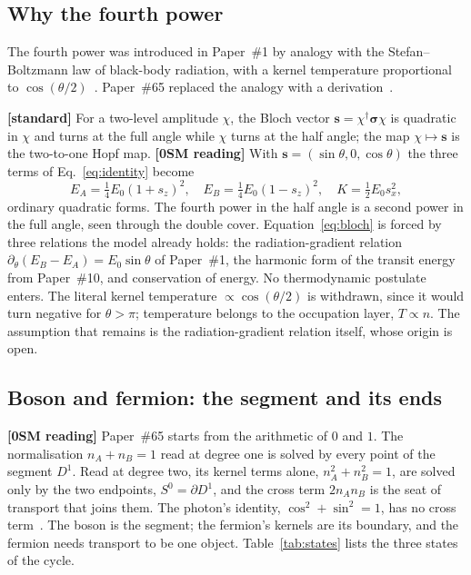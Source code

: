 \documentclass[%
 reprint, amsmath,amssymb, aps, prb, ]{revtex4-2}
\numberwithin{equation}{section}
\begin{document}
\subsection{Why the fourth power}

The fourth power was introduced in Paper~\#1 by analogy with the Stefan--Boltzmann law of black-body radiation, with a kernel temperature proportional to $\cos(\theta/2)$~\cite{hanamura01}. Paper~\#65 replaced the analogy with a derivation~\cite{hanamura65}.

\textbf{[standard]} For a two-level amplitude $\chi$, the Bloch vector $\mathbf s = \chi^{\dagger}\bm\sigma\chi$ is quadratic in $\chi$ and turns at the full angle while $\chi$ turns at the half angle; the map $\chi\mapsto\mathbf s$ is the two-to-one Hopf map. \textbf{[0SM reading]} With $\mathbf s = (\sin\theta, 0, \cos\theta)$ the three terms of Eq.~\eqref{eq:identity} become
\begin{equation}
E_A = \tfrac14E_0(1+s_z)^{2}, \quad E_B = \tfrac14E_0(1-s_z)^{2}, \quad K = \tfrac12E_0 s_x^{2},
\label{eq:bloch}
\end{equation}
ordinary quadratic forms. The fourth power in the half angle is a second power in the full angle, seen through the double cover. Equation~\eqref{eq:bloch} is forced by three relations the model already holds: the radiation-gradient relation $\partial_\theta(E_B-E_A) = E_0\sin\theta$ of Paper~\#1, the harmonic form of the transit energy from Paper~\#10, and conservation of energy. No thermodynamic postulate enters. The literal kernel temperature $\propto\cos(\theta/2)$ is withdrawn, since it would turn negative for $\theta>\pi$; temperature belongs to the occupation layer, $T\propto n$. The assumption that remains is the radiation-gradient relation itself, whose origin is open.

\subsection{Boson and fermion: the segment and its ends}

\textbf{[0SM reading]} Paper~\#65 starts from the arithmetic of $0$ and $1$. The normalisation $n_A + n_B = 1$ read at degree one is solved by every point of the segment $D^{1}$. Read at degree two, its kernel terms alone, $n_A^{2}+n_B^{2} = 1$, are solved only by the two endpoints, $S^{0} = \partial D^{1}$, and the cross term $2n_An_B$ is the seat of transport that joins them. The photon's identity, $\cos^{2}+\sin^{2}=1$, has no cross term~\cite{hanamura38}. The boson is the segment; the fermion's kernels are its boundary, and the fermion needs transport to be one object. Table~\ref{tab:states} lists the three states of the cycle.
\end{document}
